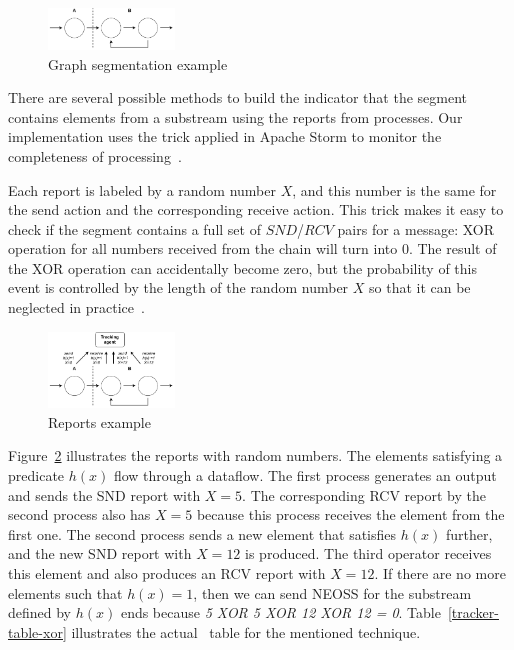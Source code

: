\begin{figure}[htbp]
  \centering
  \includegraphics[width=0.3\textwidth]{pics/segments-example.pdf}
  \caption{Graph segmentation example}
  \label{fig:tracker-acker-comparison}
\end{figure}

There are several possible methods to build the indicator that the segment contains elements from a substream using the reports from processes. Our implementation uses the trick applied in Apache Storm to monitor the completeness of processing~\cite{apache:storm:acker}. 

Each report is labeled by a random number $X$, and this number is the same for the send action and the corresponding receive action. This trick makes it easy to check if the segment contains a full set of $SND$/$RCV$ pairs for a message: XOR operation for all numbers received from the chain will turn into 0. The result of the XOR operation can accidentally become zero, but the probability of this event is controlled by the length of the random number $X$ so that it can be neglected in practice~\cite{apache:storm:acker}.

\begin{figure}[t]
  \centering
  \includegraphics[width=0.3\textwidth]{pics/tracker-segments-example.pdf}
  \caption{Reports example}
  \label{fig:tracker-reports}
\end{figure}

Figure~\ref{fig:tracker-reports} illustrates the reports with random numbers. The elements satisfying a predicate $h(x)$ flow through a dataflow. The first process generates an output and sends the SND report with $X=5$. The corresponding RCV report by the second process also has $X=5$ because this process receives the element from the first one. The second process sends a new element that satisfies $h(x)$ further, and the new SND report with $X=12$ is produced. The third operator receives this element and also produces an RCV report with $X=12$. If there are no more elements such that $h(x)=1$, then we can send NEOSS for the substream defined by $h(x)$ ends because {\em 5 XOR 5 XOR 12 XOR 12 = 0}. Table~\ref{tracker-table-xor} illustrates the actual \tracker\ table for the mentioned technique.

